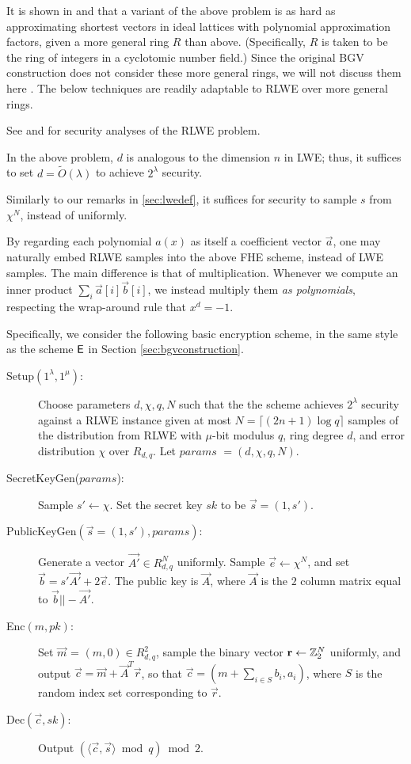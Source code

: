     It is shown in \cite{rlwe2013} and \cite{peikertrlwe} that a variant of the above problem is as hard as approximating shortest vectors in ideal lattices with polynomial approximation factors, given a more general ring $R$ than above. (Specifically, $R$ is taken to be the ring of integers in a cyclotomic number field.) Since the original BGV construction does not consider these more general rings, we will not discuss them here \cite{bgv2011}. The below techniques are readily adaptable to RLWE over more general rings.

    See \cite{rlweattacks} and \cite{peikertrlwe} for security analyses of the RLWE problem.

    In the above problem, $d$ is analogous to the dimension $n$ in LWE; thus, it suffices to set $d = \widetilde{O}(\lambda)$ to achieve $2^\lambda$ security.

    Similarly to our remarks in \ref{sec:lwedef}, it suffices for security to sample $s$ from $\chi^N$, instead of uniformly.

    By regarding each polynomial $a(x)$ as itself a coefficient vector $\vec{a}$, one may naturally embed RLWE samples into the above FHE scheme, instead of LWE samples. The main difference is that of multiplication. Whenever we compute an inner product $\sum_i \vec{a}[i] \vec{b}[i]$, we instead multiply them \emph{as polynomials}, respecting the wrap-around rule that $x^d = -1$.

    Specifically, we consider the following basic encryption scheme, in the same style as the scheme ${\sf E}$ in Section \ref{sec:bgvconstruction}.


    \begin{description}
        \item[Setup$(1^\lambda, 1^\mu)$:] Choose parameters $d, \chi, q, N$ such that the the scheme achieves $2^\lambda$ security against a RLWE instance given at most $N = \lceil (2n + 1) \log q \rceil$ samples of the distribution from RLWE with $\mu$-bit modulus $q$, ring degree $d$, and error distribution $\chi$ over $R_{d, q}$. Let $params$ $=(d, \chi, q, N)$.

        \item[SecretKeyGen($params$):] Sample $s' \leftarrow \chi$. Set the secret key $sk$ to be $\vec{s} = (1, s')$.

        \item[PublicKeyGen$(\vec{s} = (1, s'), params)$:] Generate a vector $\vec{A'} \in R_{d, q}^{N}$ uniformly. Sample $\vec{e} \leftarrow \chi^N$, and set $\vec{b} = s' \vec{A'} + 2 \vec{e}$. The public key is $\vec{A}$, where $\vec{A}$ is the $2$ column matrix equal to $\vec{b} || -\vec{A'}$.

        \item[Enc$(m, pk)$:] Set $\vec{m}$ = $(m, 0) \in R_{d,q}^2$, sample the binary vector $\mathbf{r} \leftarrow \mathbb{Z}_2^{N}$ uniformly, and output $\vec{c} = \vec{m} + \vec{A}^T \vec{r}$, so that $\vec{c} = (m + \sum_{i \in S} b_i, a_i)$, where $S$ is the random index set corresponding to $\vec{r}$.

        \item[Dec$(\vec{c}, sk)$:] Output $(\langle \vec{c}, \vec{s} \rangle \bmod q) \bmod 2$.
    \end{description}

